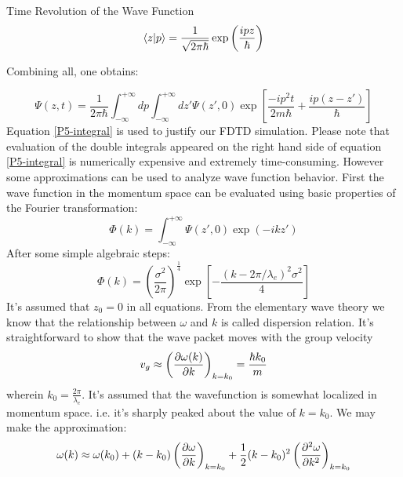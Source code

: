 \begin{homeworkProblem}
\begin{homeworkSection}{\normalsize Time Revolution of the Wave Function}
\begin{equation}
\langle z|p\rangle=\frac{1}{\sqrt{2\pi\hbar}}\exp\left(\frac{ipz}{\hbar}\right)
\end{equation}

Combining all, one obtains:

\begin{equation}\label{P5-integral}
\Psi(z,t)=\frac{1}{2\pi\hbar}\int_{-\infty}^{+\infty}dp\int_{-\infty}^{+\infty}dz'\Psi(z',0)\exp\left[\frac{-ip^2t}{2m\hbar}+\frac{ip(z-z')}{\hbar}\right]
\end{equation}
Equation \eqref{P5-integral} is used to justify our FDTD simulation. Please note that evaluation of the double integrals appeared on the right hand side of equation \eqref{P5-integral} is numerically expensive and extremely time-consuming. However some approximations can be used to analyze wave function behavior. First the wave function in the momentum space can be evaluated using basic properties of the Fourier transformation:
\begin{equation}
\Phi(k)=\int_{-\infty}^{+\infty}\Psi(z',0)\exp\left(-ikz'\right)
\end{equation}
After some simple algebraic steps:
\begin{equation}
\Phi(k)=\left(\frac{\sigma^2}{2\pi}\right)^{\frac{1}{4}}\exp\left[-\frac{(k-2\pi/\lambda_e)^2\sigma^2}{4}\right]
\end{equation}
It's assumed that $z_0=0$ in all equations. From the elementary  wave theory we know that the relationship between $\omega$ and $k$ is called dispersion relation. It's straightforward to show that the wave packet moves with the group velocity
\begin{equation}
v_g\approx\left(\dfrac{\partial \omega(k)}{\partial k}\right)_{k=k_0}=\frac{\hbar k_0}{m}
\end{equation} 
wherein $k_0=\frac{2\pi}{\lambda_e}$. It's assumed that the wavefunction is somewhat localized in momentum space. i.e. it's sharply peaked about the value of $k=k_0$. We may make the approximation:
\begin{equation}\label{P5-dis}
\omega(k)\approx \omega(k_0)+(k-k_0)\left(\dfrac{\partial \omega}{\partial k}\right)_{k=k_0}+\frac{1}{2}(k-k_0)^2\left(\dfrac{\partial^2 {\omega}}{\partial {k}^2}\right)_{k=k_0}
\end{equation}  


\end{homeworkSection}
\end{homeworkProblem}
